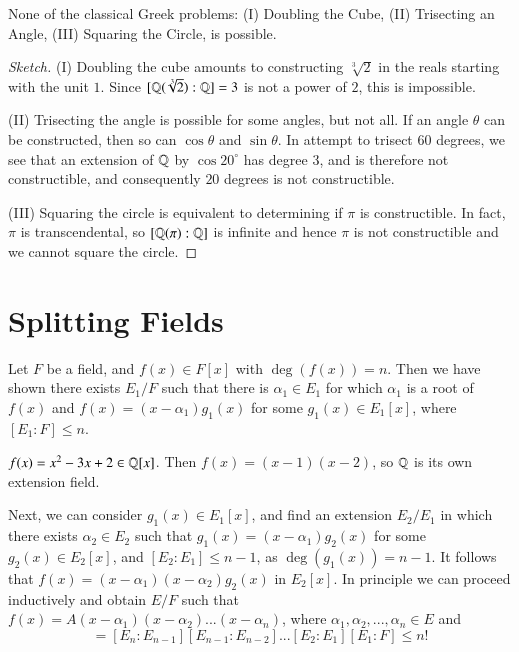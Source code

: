 \documentclass[12pt, a4paper, oneside, openright, titlepage]{book}
\begin{document}
\begin{thm}
    None of the classical Greek problems: (I) Doubling the Cube, (II) Trisecting an Angle, (III) Squaring the Circle, is possible.
\end{thm}
\begin{proof}[Sketch]
    (I) Doubling the cube amounts to constructing $\sqrt[3]{2}$ in the reals starting with the unit $1$. Since $[\mathbb Q(\sqrt[3]{2}):\mathbb Q] = 3$ is not a power of $2$, this is impossible.

    (II) Trisecting the angle is possible for some angles, but not all. If an angle $\theta$ can be constructed, then so can $\cos\theta$ and $\sin\theta$. In attempt to trisect $60$ degrees, we see that an extension of $\mathbb Q$ by $\cos20^{\circ}$ has degree $3$, and is therefore not constructible, and consequently $20$ degrees is not constructible.

    (III) Squaring the circle is equivalent to determining if $\pi$ is constructible. In fact, $\pi$ is transcendental, so $[\mathbb Q(\pi):\mathbb Q]$ is infinite and hence $\pi$ is not constructible and we cannot square the circle.
\end{proof}


\section{\textsection Splitting Fields}

Let $F$ be a field, and $f(x) \in F[x]$ with $\deg(f(x)) = n$. Then we have shown there exists $E_1/F$ such that there is $\alpha_1 \in E_1$ for which $\alpha_1$ is a root of $f(x)$ and $f(x) = (x-\alpha_1)g_1(x)$ for some $g_1(x) \in E_1[x]$, where $[E_1:F] \leq n$.

\begin{eg}
    $f(x) = x^2-3x+2 \in \mathbb Q[x]$. Then $f(x) = (x-1)(x-2)$, so $\mathbb Q$ is its own extension field.
\end{eg}


Next, we can consider $g_1(x) \in E_1[x]$, and find an extension $E_2/E_1$ in which there exists $\alpha_2 \in E_2$ such that $g_1(x) = (x-\alpha_1)g_2(x)$ for some $g_2(x) \in E_2[x]$, and $[E_2:E_1] \leq n-1$, as $\deg(g_1(x)) = n-1$. It follows that $f(x) = (x-\alpha_1)(x-\alpha_2)g_2(x)$ in $E_2[x]$. In principle we can proceed inductively and obtain $E/F$ such that $f(x) = A(x-\alpha_1)(x-\alpha_2)...(x-\alpha_n)$, where $\alpha_1,\alpha_2,...,\alpha_n \in E$ and \begin{equation*}
    [E:F] = [E_n:E_{n-1}][E_{n-1}:E_{n-2}]...[E_2:E_1][E_1:F] \leq n!
\end{equation*}
\end{document}
